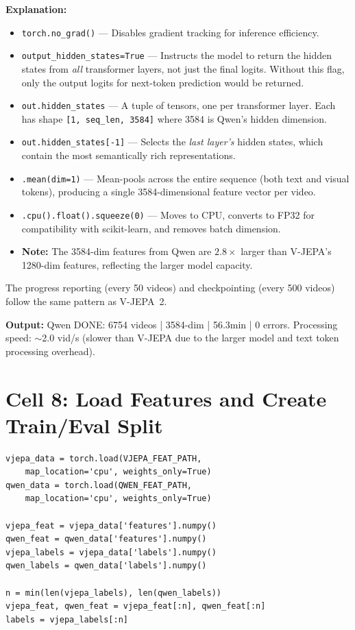\documentclass[a4paper, 12pt]{article}
\newenvironment{explanation}{%
  \par\smallskip
  \noindent\textcolor{blue!70!black}{\textbf{Explanation:}}\\
  \noindent
}{\par\medskip}
\begin{document}
\begin{explanation}
\begin{itemize}[nosep]
  \item \texttt{torch.no\_grad()} --- Disables gradient tracking for inference efficiency.
  \item \texttt{output\_hidden\_states=True} --- Instructs the model to return the hidden states from \textit{all} transformer layers, not just the final logits. Without this flag, only the output logits for next-token prediction would be returned.
  \item \texttt{out.hidden\_states} --- A tuple of tensors, one per transformer layer. Each has shape \texttt{[1, seq\_len, 3584]} where 3584 is Qwen's hidden dimension.
  \item \texttt{out.hidden\_states[-1]} --- Selects the \textit{last layer's} hidden states, which contain the most semantically rich representations.
  \item \texttt{.mean(dim=1)} --- Mean-pools across the entire sequence (both text and visual tokens), producing a single 3584-dimensional feature vector per video.
  \item \texttt{.cpu().float().squeeze(0)} --- Moves to CPU, converts to FP32 for compatibility with scikit-learn, and removes batch dimension.
  \item \textbf{Note:} The 3584-dim features from Qwen are $2.8\times$ larger than V-JEPA's 1280-dim features, reflecting the larger model capacity.
\end{itemize}
\end{explanation}

The progress reporting (every 50 videos) and checkpointing (every 500 videos) follow the same pattern as V-JEPA~2.

\textbf{Output:} Qwen DONE: 6754 videos | 3584-dim | 56.3min | 0 errors. Processing speed: $\sim$2.0 vid/s (slower than V-JEPA due to the larger model and text token processing overhead).

\newpage
\section{Cell 8: Load Features and Create Train/Eval Split}

\begin{lstlisting}
vjepa_data = torch.load(VJEPA_FEAT_PATH,
    map_location='cpu', weights_only=True)
qwen_data = torch.load(QWEN_FEAT_PATH,
    map_location='cpu', weights_only=True)

vjepa_feat = vjepa_data['features'].numpy()
qwen_feat = qwen_data['features'].numpy()
vjepa_labels = vjepa_data['labels'].numpy()
qwen_labels = qwen_data['labels'].numpy()

n = min(len(vjepa_labels), len(qwen_labels))
vjepa_feat, qwen_feat = vjepa_feat[:n], qwen_feat[:n]
labels = vjepa_labels[:n]
\end{lstlisting}
\end{document}
